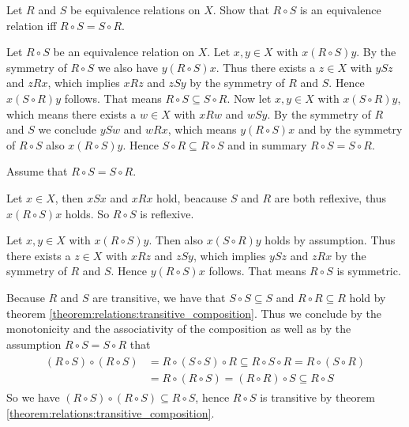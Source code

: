 \begin{exercise}
    Let $R$ and $S$ be equivalence relations on $X$. Show that $R\circ S$ is an equivalence relation iff $R\circ S=S\circ R$.
\end{exercise}

\begin{solution}
    \proofright Let $R\circ S$ be an equivalence relation on $X$. Let $x,y\in X$ with $x(R\circ S)y$. By the symmetry of $R\circ S$ we also have $y(R\circ S)x$. Thus there exists a $z\in X$ with $y S z$ and $z R x$, which implies $x R z$ and $z S y$ by the symmetry of $R$ and $S$. Hence $x(S\circ R)y$ follows. That means $R\circ S\subseteq S\circ R$. Now let $x,y\in X$ with $x(S\circ R)y$, which means there exists a $w\in X$ with $x R w$ and $w S y$. By the symmetry of $R$ and $S$ we conclude $y S w$ and $w R x$, which means $y(R\circ S)x$ and by the symmetry of $R\circ S$ also $x(R\circ S)y$. Hence $S\circ R\subseteq R\circ S$ and in summary $R\circ S=S\circ R$.

    \proofleft Assume that $R\circ S=S\circ R$.
    
     Let $x\in X$, then $x S x$ and $x R x$ hold, beacause $S$ and $R$ are both reflexive, thus $x(R\circ S)x$ holds. So $R\circ S$ is reflexive.

     Let $x,y\in X$ with $x(R\circ S)y$. Then also $x(S\circ R)y$ holds by assumption. Thus there exists a $z\in X$ with $x R z$ and $z S y$, which implies $y S z$ and $z R x$ by the symmetry of $R$ and $S$. Hence $y(R\circ S)x$ follows. That means $R\circ S$ is symmetric.

     Because $R$ and $S$ are transitive, we have that $S\circ S\subseteq S$ and $R\circ R\subseteq R$ hold by theorem \ref{theorem:relations:transitive_composition}. Thus we conclude by the monotonicity and the associativity of the composition as well as by the assumption $R\circ S=S\circ R$ that
    \begin{align}\begin{split}
        (R\circ S)\circ (R\circ S)&=R\circ (S\circ S)\circ R
        \subseteq R\circ S\circ R
        =R\circ (S\circ R)\\
        &=R\circ (R\circ S)
        =(R\circ R)\circ S\subseteq R\circ S
    \end{split}\end{align}
    So we have $(R\circ S)\circ (R\circ S)\subseteq R\circ S$, hence $R\circ S$ is transitive by theorem \ref{theorem:relations:transitive_composition}.
\end{solution}